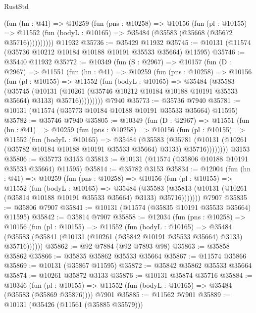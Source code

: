 \begin{lexlean}{RustStd}
\begin{coremodule}
          (fun (hn : @41) =>
          @10259
            (fun (pns : @10258) =>
            @10156
              (fun (pl : @10155) =>
              @11552 (fun (bodyL : @10165) => @35484 (@35583 (@35668 (@35672 @35716))))))))))
    @11932
@35736 := @35429 @11932
@35745 := @10131 (@11574 (@35736 @10212 @10184 @10188 @10191 @35533 @35664) @11595)
@35746 := @35440 @11932
@35772 := @10349
    (fun (S : @2967) =>
    @10157
      (fun (D : @2967) =>
      @11551
        (fun (hn : @41) =>
        @10259
          (fun (pns : @10258) =>
          @10156
            (fun (pl : @10155) =>
            @11552
              (fun (bodyL : @10165) =>
              @35484
                (@35583
                  (@35745
                    (@10131
                      (@10261 (@35746 @10212 @10184 @10188 @10191 @35533 @35664) @3133)
                      @35716)))))))))
    @7940
@35773 := @35736 @7940
@35781 := @10131 (@11574 (@35773 @10184 @10188 @10191 @35533 @35664) @11595)
@35782 := @35746 @7940
@35805 := @10349
    (fun (D : @2967) =>
    @11551
      (fun (hn : @41) =>
      @10259
        (fun (pns : @10258) =>
        @10156
          (fun (pl : @10155) =>
          @11552
            (fun (bodyL : @10165) =>
            @35484
              (@35583
                (@35781
                  (@10131 (@10261 (@35782 @10184 @10188 @10191 @35533 @35664) @3133) @35716))))))))
    @3153
@35806 := @35773 @3153
@35813 := @10131 (@11574 (@35806 @10188 @10191 @35533 @35664) @11595)
@35814 := @35782 @3153
@35834 := @12004
    (fun (hn : @41) =>
    @10259
      (fun (pns : @10258) =>
      @10156
        (fun (pl : @10155) =>
        @11552
          (fun (bodyL : @10165) =>
          @35484
            (@35583
              (@35813 (@10131 (@10261 (@35814 @10188 @10191 @35533 @35664) @3133) @35716)))))))
    @7907
@35835 := @35806 @7907
@35841 := @10131 (@11574 (@35835 @10191 @35533 @35664) @11595)
@35842 := @35814 @7907
@35858 := @12034
    (fun (pns : @10258) =>
    @10156
      (fun (pl : @10155) =>
      @11552
        (fun (bodyL : @10165) =>
        @35484 (@35583 (@35841 (@10131 (@10261 (@35842 @10191 @35533 @35664) @3133) @35716))))))
@35862 := @92 @7884 (@92 @7893 @98)
@35863 := @35858 @35862
@35866 := @35835 @35862 @35533 @35664
@35867 := @11574 @35866
@35869 := @10131 (@35867 @11595)
@35872 := @35842 @35862 @35533 @35664
@35874 := @10261 @35872 @3133
@35876 := @10131 @35874 @35716
@35884 := @10346
    (fun (pl : @10155) => @11552 (fun (bodyL : @10165) => @35484 (@35583 (@35869 @35876))))
    @7901
@35885 := @11562 @7901
@35889 := @10131 (@35426 (@11561 (@35885 @35579)))

\end{coremodule}
\end{lexlean}
